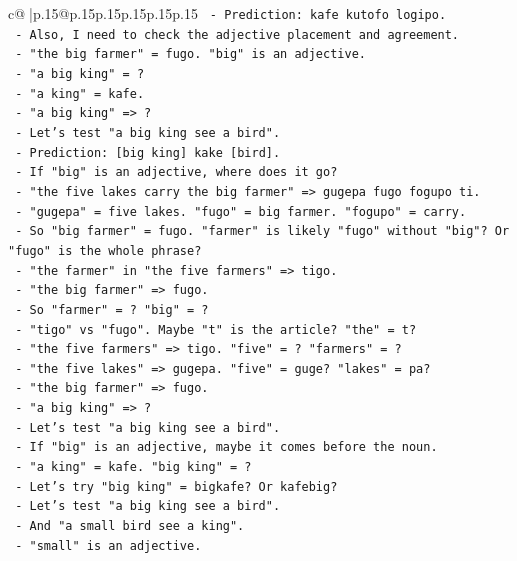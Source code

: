 \documentclass{article}
\begin{document}
{\begin{supertabular}{c@{$\;$}|p{.15\linewidth}@{}p{.15\linewidth}p{.15\linewidth}p{.15\linewidth}p{.15\linewidth}p{.15\linewidth}}
{{{\texttt{  {-} Prediction: kafe kutofo logipo.} \\
\texttt{  {-} Also, I need to check the adjective placement and agreement.} \\
\texttt{  {-} "the big farmer" = fugo. "big" is an adjective.} \\
\texttt{  {-} "a big king" = ?} \\
\texttt{  {-} "a king" = kafe.} \\
\texttt{  {-} "a big king" => ?} \\
\texttt{  {-} Let's test "a big king see a bird".} \\
\texttt{  {-} Prediction: {[}big king{]} kake {[}bird{]}.} \\
\texttt{  {-} If "big" is an adjective, where does it go?} \\
\texttt{  {-} "the five lakes carry the big farmer" => gugepa fugo fogupo ti.} \\
\texttt{  {-} "gugepa" = five lakes. "fugo" = big farmer. "fogupo" = carry.} \\
\texttt{  {-} So "big farmer" = fugo. "farmer" is likely "fugo" without "big"? Or "fugo" is the whole phrase?} \\
\texttt{  {-} "the farmer" in "the five farmers" => tigo.} \\
\texttt{  {-} "the big farmer" => fugo.} \\
\texttt{  {-} So "farmer" = ? "big" = ?} \\
\texttt{  {-} "tigo" vs "fugo". Maybe "t" is the article? "the" = t?} \\
\texttt{  {-} "the five farmers" => tigo. "five" = ? "farmers" = ?} \\
\texttt{  {-} "the five lakes" => gugepa. "five" = guge? "lakes" = pa?} \\
\texttt{  {-} "the big farmer" => fugo.} \\
\texttt{  {-} "a big king" => ?} \\
\texttt{  {-} Let's test "a big king see a bird".} \\
\texttt{  {-} If "big" is an adjective, maybe it comes before the noun.} \\
\texttt{  {-} "a king" = kafe. "big king" = ?} \\
\texttt{  {-} Let's try "big king" = bigkafe? Or kafebig?} \\
\texttt{  {-} Let's test "a big king see a bird".} \\
\texttt{  {-} And "a small bird see a king".} \\
\texttt{  {-} "small" is an adjective.} \\
}}}
\end{supertabular}}
\end{document}
